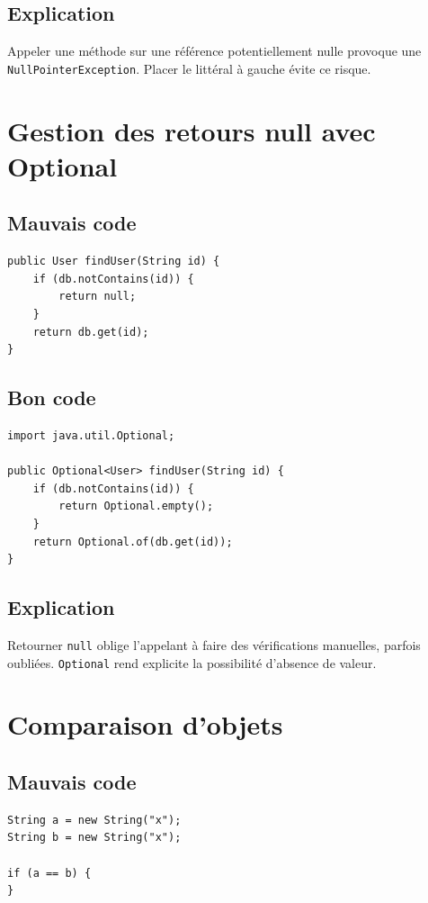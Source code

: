 \documentclass[a4paper,11pt]{report}
\begin{document}
\section{Explication}
Appeler une méthode sur une référence potentiellement nulle provoque une \texttt{NullPointerException}.
Placer le littéral à gauche évite ce risque.

\chapter{Gestion des retours null avec Optional}

\section{Mauvais code}
\begin{lstlisting}
public User findUser(String id) {
    if (db.notContains(id)) {
        return null;
    }
    return db.get(id);
}
\end{lstlisting}

\section{Bon code}
\begin{lstlisting}
import java.util.Optional;

public Optional<User> findUser(String id) {
    if (db.notContains(id)) {
        return Optional.empty();
    }
    return Optional.of(db.get(id));
}
\end{lstlisting}

\section{Explication}
Retourner \texttt{null} oblige l'appelant à faire des vérifications manuelles, parfois oubliées.
\texttt{Optional} rend explicite la possibilité d'absence de valeur.

\chapter{Comparaison d'objets}

\section{Mauvais code}
\begin{lstlisting}
String a = new String("x");
String b = new String("x");

if (a == b) {
}
\end{lstlisting}
\end{document}
